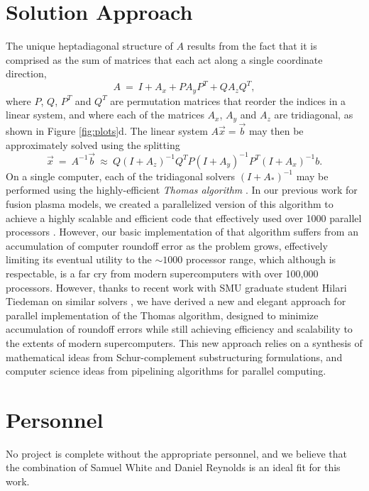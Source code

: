 \documentclass[final]{siamltex}
\renewcommand{\(}{\left(}
\renewcommand{\)}{\right)}
\begin{document}
\section{Solution Approach}
\label{sec:solvers}

The unique heptadiagonal structure of $A$ results from the fact that
it is comprised as the sum of matrices that each act along a single
coordinate direction,
\begin{equation}
\label{eq:A}
   A \ = \ I + A_x + P A_y P^T + Q A_z Q^T,
\end{equation}
where $P$, $Q$, $P^T$ and $Q^T$ are permutation matrices that reorder
the indices in a linear system, and where each of the matrices
$A_x$, $A_y$ and $A_z$ are tridiagonal, as shown in Figure
\ref{fig:plots}d.  The linear system $A\vec{x}=\vec{b}$ may then be
approximately solved using the splitting
\[
   \vec{x} \ = \ A^{-1}\vec{b} 
   \ \approx \ Q(I + A_z)^{-1}Q^TP(I + A_y)^{-1}P^T(I + A_x)^{-1}b.
\]
On a single computer, each of the tridiagonal solvers $(I+A_*)^{-1}$
may be performed using the highly-efficient {\em Thomas algorithm}
\cite{Conte1972}. In our previous work for fusion plasma models, we
created a parallelized version of this algorithm to achieve a highly
scalable and efficient code that effectively used over 1000 parallel processors 
\cite{ReynoldsSamtaneyWoodward2010}.  However, our basic
implementation of that algorithm suffers from an accumulation of
computer roundoff error as the problem grows, effectively limiting its 
eventual utility to the $\sim\!\!1000$ processor range, which although
is respectable, is a far cry from modern supercomputers with over
100,000 processors.  However, thanks to recent work with SMU graduate
student Hilari Tiedeman on similar solvers
\cite{TiedemanReynolds2011}, we have derived a new
and elegant approach for parallel implementation of the Thomas
algorithm, designed to minimize accumulation of roundoff errors while
still achieving efficiency and scalability to the extents of modern
supercomputers.  This new approach relies on a synthesis of
mathematical ideas from Schur-complement substructuring formulations,
and computer science ideas from pipelining algorithms for parallel
computing. 


\section{Personnel}
\label{sec:sam}

No project is complete without the appropriate personnel, and we
believe that the combination of Samuel White and Daniel Reynolds is an
ideal fit for this work.  
\end{document}
